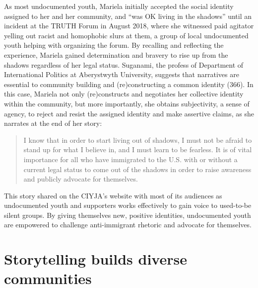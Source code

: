 \documentclass[12pt]{article}
\begin{document}
\begin{flushleft}
\noindent
As most undocumented youth, Mariela initially accepted the social identity assigned to her and her community, and ``was OK living in the shadows'' until an incident at the TRUTH Forum in August 2018, where she witnessed paid agitator yelling out racist and homophobic slurs at them, a group of local undocumented youth helping with organizing the forum.
By recalling and reflecting the experience, Mariela gained determination and bravery to rise up from the shadows regardless of her legal status.
Suganami, the profess of Department of International Politics at Aberystwyth University, suggests that narratives are essential to community building and (re)constructing a common identity (366).
In this case, Mariela not only (re)constructs and negotiates her collective identity within the community, but more importantly, she obtains subjectivity, a sense of agency, to reject and resist the assigned identity and make assertive claims, as she narrates at the end of her story:

\begin{quotation}
    \noindent
    I know that in order to start living out of shadows, I must not be afraid to stand up for what I believe in, and I must learn to be fearless.
    It is of vital importance for all who have immigrated to the U.S. with or without a current legal status to come out of the shadows in order to raise awareness and publicly advocate for themselves.
\end{quotation} %

\noindent
This story shared on the CIYJA's website with most of its audiences as undocumented youth and supporters works effectively to gain voice to used-to-be silent groups. 
By giving themselves new, positive identities, undocumented youth are empowered to challenge anti-immigrant rhetoric and advocate for themselves.

\section*{Storytelling builds diverse communities}


\end{flushleft}
\end{document}
